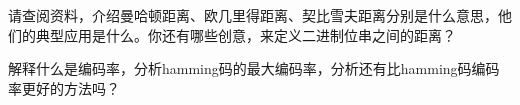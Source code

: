 \documentclass[a4paper, justified]{tufte-handout}
\begin{document}
\beginoptional



\beginot
\begin{ot}[各种花式距离]
  请查阅资料，介绍曼哈顿距离、欧几里得距离、契比雪夫距离分别是什么意思，他们的典型应用是什么。你还有哪些创意，来定义二进制位串之间的距离？
\end{ot}


\begin{ot}[编码率]
  解释什么是编码率，分析hamming码的最大编码率，分析还有比hamming码编码率更好的方法吗？
\end{ot}




% 




\beginfb

% 
% 
\end{document}
